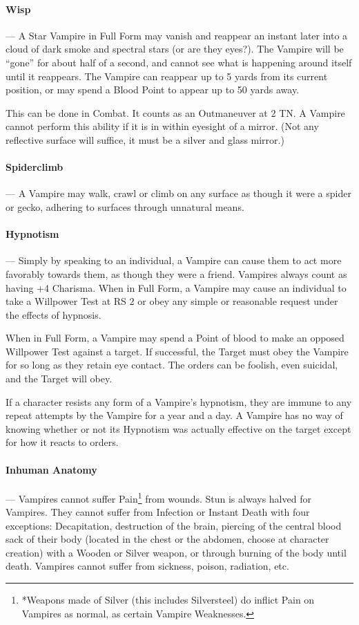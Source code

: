 \documentclass[oneside,11pt,english]{book}
\begin{document}
\paragraph{Wisp}---\quad
A Star Vampire in Full Form may vanish and reappear an instant later into a cloud of dark 
smoke and spectral stars (or are they eyes?). The Vampire will be “gone” for about half of a 
second, and cannot see what is happening around itself until it reappears. The Vampire can 
reappear up to 5 yards from its current position, or may spend a Blood Point to appear up to 50 
yards away.

This can be done in Combat. It counts as an Outmaneuver at 2 TN.
A Vampire cannot perform this ability if it is in within eyesight of a mirror. (Not any reflective 
surface will suffice, it must be a silver and glass mirror.)

\paragraph{Spiderclimb}---\quad
A Vampire may walk, crawl or climb on any surface as though it were a spider or gecko, 
adhering to surfaces through unnatural means. 

\paragraph{Hypnotism}---\quad
Simply by speaking to an individual, a Vampire can cause them to act more favorably towards 
them, as though they were a friend. Vampires always count as having +4 Charisma. 
When in Full Form, a Vampire may cause an individual to take a Willpower Test at RS 2 or obey 
any simple or reasonable request under the effects of hypnosis. 

When in Full Form, a Vampire may spend a Point of blood to make an opposed Willpower Test 
against a target. If successful, the Target must obey the Vampire for so long as they retain eye 
contact. The orders can be foolish, even suicidal, and the Target will obey. 

If a character resists any form of a Vampire's hypnotism, they are immune to any repeat 
attempts by the Vampire for a year and a day. A Vampire has no way of knowing whether or not 
its Hypnotism was actually effective on the target except for how it reacts to orders. 

\paragraph{Inhuman Anatomy}---\quad
Vampires cannot suffer Pain\footnote{*Weapons made of Silver (this includes Silversteel) do inflict Pain on Vampires as normal, as certain Vampire Weaknesses.} from wounds. Stun is always halved for Vampires. They cannot 
suffer from Infection or Instant Death with four exceptions: Decapitation, destruction of the brain, 
piercing of the central blood sack of their body (located in the chest or the abdomen, choose at 
character creation) with a Wooden or Silver weapon, or through burning of the body until death. 
Vampires cannot suffer from sickness, poison, radiation, etc. 
\end{document}
